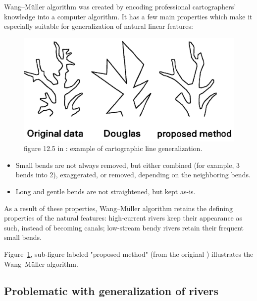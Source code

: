 \documentclass[a4paper]{article}
\newcommand{\titlecite}[1]{\citetitle{#1}\cite{#1}}
\newcommand{\WM}{Wang--M{\"u}ller}
\begin{document}
{\WM} algorithm was created by encoding professional cartographers' knowledge
into a computer algorithm. It has a few main properties which make it
especially suitable for generalization of natural linear features:

\begin{figure}[b]
    \centering
    \includegraphics[width=.8\textwidth]{wang125}
    \caption{figure 12.5 in \cite{wang1998line}: example of cartographic line
    generalization.}
    \label{fig:wang125}
\end{figure}

\begin{itemize}
    \item Small bends are not always removed, but either combined (for example,
        3 bends into 2), exaggerated, or removed, depending on the neighboring
        bends.
    \item Long and gentle bends are not straightened, but kept as-is.
\end{itemize}

As a result of these properties, {\WM} algorithm retains the defining
properties of the natural features: high-current rivers keep their appearance
as such, instead of becoming canals; low-stream bendy rivers retain their
frequent small bends.

Figure~\ref{fig:wang125}, sub-figure labeled "proposed method" (from the
original \titlecite{wang1998line}) illustrates the {\WM} algorithm.

\subsection{Problematic with generalization of rivers}

\end{document}
